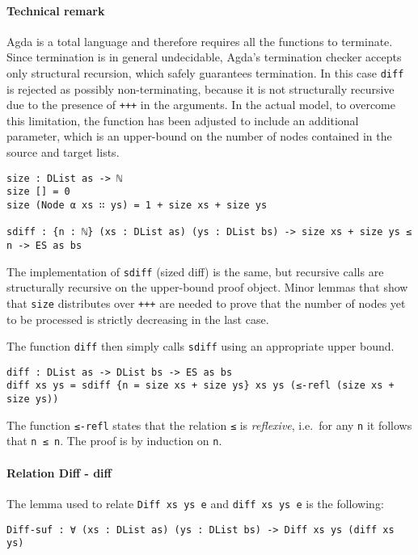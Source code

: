 \documentclass[../Thesis.tex]{subfiles}
\begin{document}
	\paragraph{Technical remark}
	Agda is a total language and therefore requires all the functions to 
	terminate. Since termination is in general undecidable, Agda's termination 
	checker accepts only structural recursion, which safely guarantees
	termination. In this case \texttt{diff} is rejected as possibly 
	non-terminating, because it is not structurally recursive
	due to the presence of \texttt{+++} in the arguments. 
	In the actual model, to overcome this limitation, the function has been 
	adjusted to include an additional parameter, which is an upper-bound 
	on the number of nodes contained in the source and target lists.
	
\begin{verbatim}
size : DList as -> ℕ 
size [] = 0
size (Node α xs ∷ ys) = 1 + size xs + size ys

sdiff : {n : ℕ} (xs : DList as) (ys : DList bs) -> size xs + size ys ≤ n -> ES as bs
\end{verbatim}
	
	The implementation of \texttt{sdiff} (sized diff) is the same, but recursive 
	calls	are structurally recursive on the upper-bound proof object.
	Minor lemmas that show that \texttt{size} distributes over \texttt{+++}
	are needed to prove that the number of nodes yet to be processed
	is strictly decreasing in the last case.

	The function \texttt{diff} then simply calls \texttt{sdiff} using an appropriate
	upper bound.
		
\begin{verbatim}
diff : DList as -> DList bs -> ES as bs
diff xs ys = sdiff {n = size xs + size ys} xs ys (≤-refl (size xs + size ys))
\end{verbatim}

	The function \texttt{≤-refl} states that the relation \texttt{≤} is 
	\emph{reflexive}, i.e.\ for any \texttt{n} it follows that \texttt{n ≤ n}.
	The proof is by induction on \texttt{n}.	 

	\paragraph{Relation Diff - diff} 	
	
	The lemma used to relate \texttt{Diff xs ys e} and \texttt{diff xs ys e} 
	is the following:
\begin{verbatim}	
Diff-suf : ∀ (xs : DList as) (ys : DList bs) -> Diff xs ys (diff xs ys)
\end{verbatim}
\end{document}
